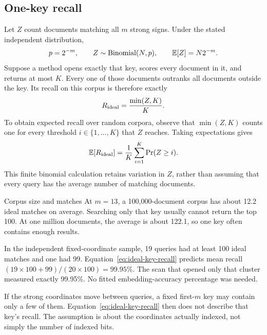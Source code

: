 \subsection{One-key recall}
Let $Z$ count documents matching all $m$ strong signs. Under the stated independent distribution,
\[
p=2^{-m},\qquad Z\sim\operatorname{Binomial}(N,p),\qquad \mathbb E[Z]=N2^{-m}.
\]
Suppose a method opens exactly that key, scores every document in it, and returns at most $K$.
Every one of those documents outranks all documents outside the key. Its recall on this corpus
is therefore exactly
\begin{equation}
R_{\rm ideal}=\frac{\min(Z,K)}{K}.
\label{eq:ideal-key-recall}
\end{equation}
To obtain expected recall over random corpora, observe that $\min(Z,K)$ counts one for every
threshold $i\in\{1,\ldots,K\}$ that $Z$ reaches. Taking expectations gives
\begin{equation}
\mathbb E[R_{\rm ideal}]=\frac{1}{K}\sum_{i=1}^{K}\Pr(Z\ge i).
\label{eq:expected-ideal-recall}
\end{equation}
This finite binomial calculation retains variation in $Z$, rather than assuming that
every query has the average number of matching documents.

\begin{examplebox}{Corpus size and matches}
At $m=13$, a 100,000-document corpus has about 12.2 ideal matches on average. Searching only
that key usually cannot return the top 100. At one million documents, the average is about
122.1, so one key often contains enough results.

In the independent fixed-coordinate sample, 19 queries had at least 100 ideal matches and
one had 99. Equation~\eqref{eq:ideal-key-recall} predicts mean recall
$(19\times100+99)/(20\times100)=99.95\%$. The scan that opened only that cluster measured exactly
99.95\%. No fitted embedding-accuracy percentage was needed.
\end{examplebox}
If the strong coordinates move between queries, a fixed first-$m$ key may contain only a few
of them. Equation~\eqref{eq:ideal-key-recall} then does not describe that key's recall. The
assumption is about the coordinates actually indexed, not simply the number of indexed bits.


